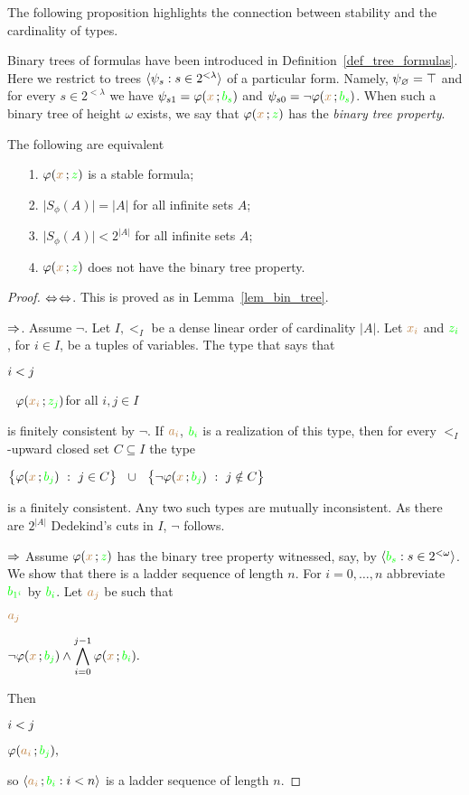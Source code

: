 \documentclass[creche.tex]{subfiles}
\begin{document}
The following proposition highlights the connection between stability and the cardinality of types. 

Binary trees of formulas have been introduced in Definition~\ref{def_tree_formulas}. Here we restrict to trees $\langle\psi_s:s\in 2^{<\lambda}\rangle$ of a particular form. Namely, $\psi_\varnothing=\top$ and for every $s\in 2^{<\lambda}$ we have $\psi_{s1}=\varphi({\color{brown} x}\,;{\color{green} b_s})$ and $\psi_{s0}=\neg\varphi({\color{brown} x}\,;{\color{green} b_s})$. When such a binary tree of height $\omega$ exists, we say that $\varphi({\color{brown} x}\,;{\color{green} z})$ has the \emph{binary tree property}.

\begin{proposition}\label{prop_count_types}
The following are equivalent
\begin{itemize}
\item[1.] $\varphi({\color{brown} x}\,;{\color{green} z})$ is a stable formula;
\item[2.] $\big|S_{\phi}(A)\big|=|A|$ for all infinite sets $A$;
\item[3.] $\big|S_{\phi}(A)\big|<2^{|A|}$ for all infinite sets $A$;
\item[4.] $\varphi({\color{brown} x}\,;{\color{green} z})$ does not have the binary tree property.
\end{itemize}
\end{proposition}

\def\ceq#1#2#3{\parbox[t]{15ex}{$\displaystyle #1$}\medrel{#2}$\displaystyle  #3$}

\begin{proof}$\Leftrightarrow$$\Leftrightarrow$. This is proved as in Lemma~\ref{lem_bin_tree}.

$\Rightarrow$.
Assume $\neg$. Let $I,<_I$ be a dense linear order of cardinality $|A|$. Let ${\color{brown} x_i}$ and ${\color{green} z_i}$, for $i\in I$, be a tuples of variables. The type that says that

\ceq{\hfill i< j}{\IFF}{\phantom{\neg}\phi({\mr x_i}\,;{\gr z_j})}\hfill for all $i,j\in I$

is finitely consistent by $\neg$. If ${\color{brown} a_i}$, ${\color{green} b_i}$ is a realization of this type, then for every $<_I$-upward closed set $C\subseteq I$ the type

\hfil $\big\{\varphi({\color{brown} x}\,;{\color{green} b_j})\ :\ j\in C\big\}\ \ \cup\ \ \big\{\neg\varphi({\color{brown} x}\,;{\color{green} b_j})\ :\ j\notin C\big\}$

is a finitely consistent. Any two such types are mutually inconsistent. As there are $2^{|A|}$ Dedekind's cuts in $I$, $\neg$ follows.

$\Rightarrow$ Assume $\varphi({\color{brown} x}\,;{\color{green} z})$ has the binary tree property witnessed, say, by  $\langle{\color{green}b_s}:s\in 2^{<\omega}\rangle$. We show that there is a ladder sequence of length $n$. For $i=0,\dots, n$ abbreviate ${\color{green} b_{1^i}}$ by ${\color{green} b_i}$. Let ${\color{brown} a_j}$ be such that

\ceq{\hfill {\mr a_j}}{\models}{\displaystyle \neg\phi({\mr x}\,;{\gr b_j})\wedge\bigwedge^{j-1}_{i=0}\phi({\mr x}\,;{\gr b_i}).}

Then

\ceq{\hfill i<j}{\IFF}{\phi({\mr a_i}\,;{\gr b_j}),}

so $\langle{\color{brown}a_i}\,;{\color{green} b_i} : i<n\rangle$ is a ladder sequence of length $n$.
\end{proof}
\end{document}
